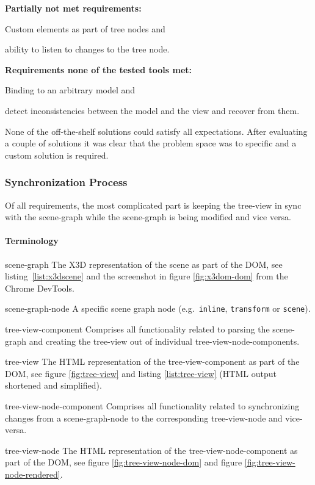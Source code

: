\textbf{Partially not met requirements:}

\begin{itemize*}
  \item Custom elements as part of tree nodes and
  \item ability to listen to changes to the tree node.
\end{itemize*}

\textbf{Requirements none of the tested tools met:}

\begin{itemize*}
  \item Binding to an arbitrary model and
  \item detect inconsistencies between the model and the view and recover from them.
\end{itemize*}

None of the off-the-shelf solutions could satisfy all expectations. After
evaluating a couple of solutions it was clear that the problem space was to
specific and a custom solution is required.

\subsubsection{Synchronization Process}

Of all requirements, the most complicated part is keeping the tree-view in sync
with the scene-graph while the scene-graph is being modified and vice
versa.

\paragraph{Terminology}
\label{terminology}

\begin{description*}
  \item[scene-graph]
    The \gls{X3D} representation of the scene as part of the \gls{DOM}, see listing~\ref{list:x3dscene} and the screenshot in figure \ref{fig:x3dom-dom} from the Chrome DevTools.
  \item[scene-graph-node]
    A specific scene graph node (e.g.~\texttt{inline}, \texttt{transform} or \texttt{scene}).
  \item[tree-view-component]
    Comprises all functionality related to parsing the scene-graph and creating the tree-view out of individual tree-view-node-components.
  \item[tree-view]
    The \gls{HTML} representation of the tree-view-component as part of the \gls{DOM}, see figure \ref{fig:tree-view} and listing \ref{list:tree-view} (\gls{HTML} output
    shortened and simplified).
  \item[tree-view-node-component]
    Comprises all functionality related to synchronizing changes from a scene-graph-node to the corresponding
    tree-view-node and vice-versa.
  \item[tree-view-node]
    The \gls{HTML} representation of the tree-view-node-component as part of the \gls{DOM}, see figure \ref{fig:tree-view-node-dom} and figure \ref{fig:tree-view-node-rendered}.
\end{description*}

